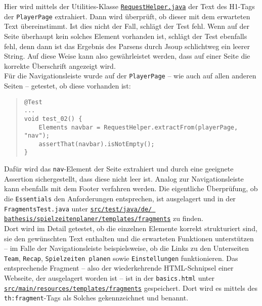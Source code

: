 Hier wird mittels der Utilities-Klasse \href{https://github.com/FlorianOhmes/bat_spielzeitenplaner/blob/main/spielzeitenplaner/src/test/java/de/bathesis/spielzeitenplaner/utilities/RequestHelper.java}{\texttt{RequestHelper.java}} der 
Text des H1-Tags der \texttt{PlayerPage} extrahiert. Dann wird überprüft, ob dieser 
mit dem erwarteten Text übereinstimmt. Ist dies nicht der Fall, schlägt der Test 
fehl. Wenn auf der Seite überhaupt kein solches Element vorhanden ist, schlägt der 
Test ebenfalls fehl, denn dann ist das Ergebnis des Parsens durch Jsoup schlichtweg 
ein leerer String. Auf diese Weise kann also gewährleistet werden, dass auf einer 
Seite die korrekte Überschrift angezeigt wird. \\ 
Für die Navigationsleiste wurde auf der \texttt{PlayerPage} -- wie auch auf allen 
anderen Seiten -- getestet, ob diese vorhanden ist: 

\begin{quote}
\begin{verbatim}
@Test
... 
void test_02() {
    Elements navbar = RequestHelper.extractFrom(playerPage, "nav");
    assertThat(navbar).isNotEmpty();
}
\end{verbatim}
\end{quote}

Dafür wird das \texttt{nav}-Element der Seite extrahiert und durch eine geeignete 
Assertion sichergestellt, dass diese nicht leer ist. Analog zur Navigationsleiste 
kann ebenfalls mit dem Footer verfahren werden. Die eigentliche Überprüfung, ob 
die \texttt{Essentials} den Anforderungen entsprechen, ist ausgelagert und in der 
\texttt{FragmentsTest.java} unter 
\href{https://github.com/FlorianOhmes/bat_spielzeitenplaner/blob/main/spielzeitenplaner/src/test/java/de/bathesis/spielzeitenplaner/templates/fragments/FragmentsTest.java}{\texttt{src/test/java/de/ \linebreak bathesis/spielzeitenplaner/templates/fragments}} 
zu finden. \\ 
Dort wird im Detail getestet, ob die einzelnen Elemente korrekt strukturiert sind, 
sie den gewünschten Text enthalten und die erwarteten Funktionen unterstützen -- im 
Falle der Navigationsleiste beispielsweise, ob die Links zu den Unterseiten 
\texttt{Team}, \texttt{Recap}, \texttt{Spielzeiten planen} sowie 
\texttt{Einstellungen} funktionieren. Das entsprechende Fragment -- also der 
wiederkehrende HTML-Schnipsel einer Webseite, der ausgelagert worden ist -- ist in 
der \texttt{basics.html} unter \href{https://github.com/FlorianOhmes/bat_spielzeitenplaner/tree/main/spielzeitenplaner/src/main/resources/templates/fragments}{\texttt{src/main/resources/templates/fragments}} 
gespeichert. Dort wird es mittels des \texttt{th:fragment}-Tags als Solches 
gekennzeichnet und benannt. 

